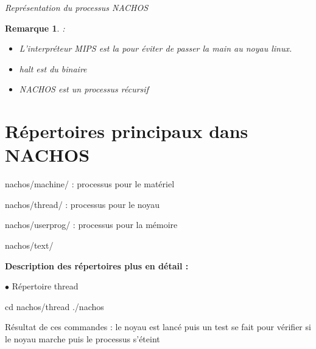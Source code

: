 \documentclass[12pt,a4paper]{report}
\newtheorem*{rem}{Remarque}
\begin{document}
\textit{Représentation du processus NACHOS}
\begin{center}
\end{center}

\begin{rem}:\\
\begin{itemize}
\item L'interpréteur MIPS est la pour éviter de passer la main au noyau linux.
\item halt est du binaire
\item NACHOS est un processus récursif
\\
\end{itemize}
\end{rem}

\section{Répertoires principaux dans NACHOS}
\begin{description}
\item nachos/machine/ : processus pour le matériel
\item nachos/thread/ : processus pour le noyau
\item nachos/userprog/ : processus pour la mémoire
\item nachos/text/
\\
\end{description}
\bigskip

\textbf{Description des répertoires plus en détail :\\}

$\bullet$ Répertoire thread
\begin{verbatimtab}
cd nachos/thread
./nachos
\end{verbatimtab}
Résultat de ces commandes : le noyau est lancé puis un test se fait pour vérifier si le noyau marche puis le processus s’éteint 
\end{document}
